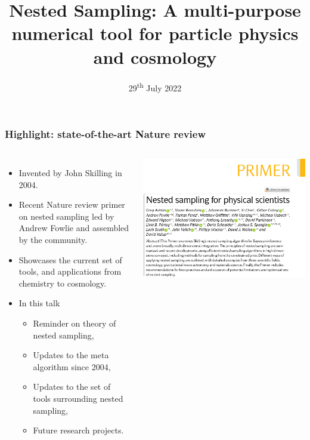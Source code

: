 \documentclass[aspectratio=169]{beamer}
\title{Nested Sampling: A multi-purpose numerical tool for particle physics and cosmology}
\date{29\textsuperscript{th} July 2022}
\begin{document}
\begin{frame}
    \titlepage
\end{frame}

\begin{frame}
    \frametitle{Highlight: state-of-the-art Nature review}
    \begin{columns}
        \begin{itemize}
            \item Invented by John Skilling in 2004.
            \item Recent Nature review primer on nested sampling led by Andrew Fowlie and assembled by the community.
            \item Showcases the current set of tools, and applications from chemistry to cosmology.
            \item In this talk
                \begin{itemize}
                    \item Reminder on theory of nested sampling,
                    \item Updates to the meta algorithm since 2004,
                    \item Updates to the set of tools surrounding nested sampling,
                    \item Future research projects.
                \end{itemize}
        \end{itemize}
        \includegraphics[width=\textwidth]{figures/nature1}

\end{columns}
\end{frame}
\end{document}
